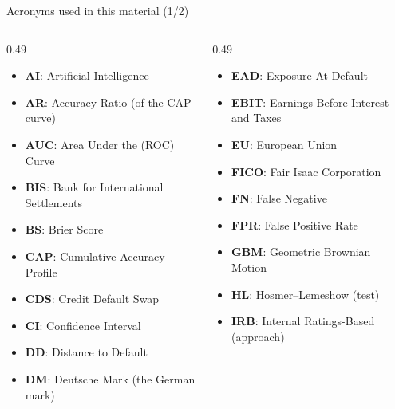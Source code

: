 
{
\begin{frame}[noframenumbering]
    \titlepage
\end{frame}
}
\begin{frame}{Acronyms used in this material (1/2)}
\begin{columns}[T]
\begin{column}{0.49\textwidth}
\begin{itemize}\setlength{\itemsep}{0pt}
    \item \textbf{AI}: Artificial Intelligence
    \item \textbf{AR}: Accuracy Ratio (of the CAP curve)
    \item \textbf{AUC}: Area Under the (ROC) Curve
    \item \textbf{BIS}: Bank for International Settlements
    \item \textbf{BS}: Brier Score
    \item \textbf{CAP}: Cumulative Accuracy Profile
    \item \textbf{CDS}: Credit Default Swap
    \item \textbf{CI}: Confidence Interval
    \item \textbf{DD}: Distance to Default
    \item \textbf{DM}: Deutsche Mark (the German mark)
\end{itemize}
\end{column}
\begin{column}{0.49\textwidth}
\begin{itemize}\setlength{\itemsep}{0pt}
    \item \textbf{EAD}: Exposure At Default
    \item \textbf{EBIT}: Earnings Before Interest and Taxes
    \item \textbf{EU}: European Union
    \item \textbf{FICO}: Fair Isaac Corporation
    \item \textbf{FN}: False Negative
    \item \textbf{FPR}: False Positive Rate
    \item \textbf{GBM}: Geometric Brownian Motion
    \item \textbf{HL}: Hosmer–Lemeshow (test)
    \item \textbf{IRB}: Internal Ratings-Based (approach)
\end{itemize}
\end{column}
\end{columns}
\end{frame}
